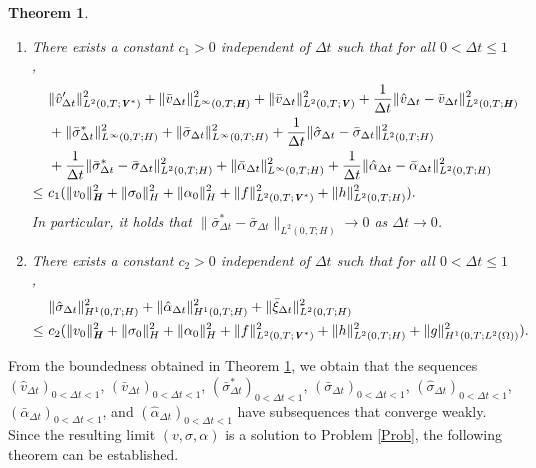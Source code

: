 \documentclass[11pt, a4paper]{article}
\newtheorem{Th}{Theorem}[section]
\newcommand{\dt}{{\Delta t}}
\newcommand{\Lo}{{L^2(\Omega)}}
\newcommand{\bm}[1]{\textbf{\textit{#1}}}%
\newcommand{\Hv}{{\bm{H}}}
\newcommand{\Vv}{{\bm{V}}}
\newcommand{\Hs}{{H}}
\begin{document}
\begin{Th}\label{Th:stab}~
    \begin{enumerate}
        \item[(i)] There exists a constant $c_1 > 0$ independent of $\dt$ such that for all $0<\dt\le1$,
        \[\begin{aligned}
            &\|\hat{v}'_\dt\|_{L^2(0,T;\Vv^*)}^2
            +\|\bar{v}_\dt\|_{L^\infty(0,T;\Hv)}^2 
            + \|\bar{v}_\dt\|_{L^2(0,T;\Vv)}^2
            + \frac{1}{\dt}\|\hat{v}_\dt - \bar{v}_\dt\|_{L^2(0,T;\Hv)}^2\\
            &+ \|\bar{\sigma}^*_\dt\|_{L^\infty(0,T;\Hs)}^2 
            + \|\bar{\sigma}_\dt\|_{L^\infty(0,T;\Hs)}^2
            + \frac{1}{\dt}\|\hat{\sigma}_\dt - \bar{\sigma}_\dt\|_{L^2(0,T;\Hs)}^2\\
            &+ \frac{1}{\dt}\|\bar{\sigma}^*_\dt - \bar{\sigma}_\dt\|_{L^2(0,T;\Hs)}^2
            + \|\bar{\alpha}_\dt\|_{L^\infty(0,T;\Hs)}^2
            + \frac{1}{\dt}\|\hat{\alpha}_\dt - \bar{\alpha}_\dt\|_{L^2(0,T;\Hs)}^2\\
            \le~& c_1(\|v_0\|_\Hv^2 + \|\sigma_0\|_\Hs^2 + \|\alpha_0\|_\Hs^2
            + \|f\|_{L^2(0,T;\Vv^*)}^2 + \|h\|_{L^2(0,T;\Hs)}^2).
        \end{aligned}\]
        In particular, it holds that
        $\|\bar{\sigma}^*_\dt - \bar{\sigma}_\dt\|_{L^2(0,T;\Hs)}\rightarrow0$
        as $\dt\rightarrow0$.
        \item[(ii)] There exists a constant $c_2 > 0$ independent of $\dt$ such that for all $0<\dt\le1$,
        \[\begin{aligned}
            & \|\hat{\sigma}_\dt\|_{H^1(0,T;\Hs)}^2 
            + \|\hat{\alpha}_\dt\|_{H^1(0,T;\Hs)}^2 
            + \|\bar{\xi}_\dt\|_{L^2(0,T;\Hs)}^2\\
            \le~& c_2(\|v_0\|_\Hv^2 + \|\sigma_0\|_\Hs^2 + \|\alpha_0\|_\Hs^2 
            + \|f\|_{L^2(0,T;\Vv^*)}^2 + \|h\|_{L^2(0,T;\Hs)}^2 + \|g\|_{H^1(0,T;\Lo)}^2).
        \end{aligned}\]
    \end{enumerate}
\end{Th}

From the boundedness obtained in Theorem \ref{Th:stab}, we obtain that the sequences $(\hat{v}_\dt)_{0<\dt<1}$, $(\bar{v}_\dt)_{0<\dt<1}$, $(\bar{\sigma}^*_\dt)_{0<\dt<1}$, $(\bar{\sigma}_\dt)_{0<\dt<1}$, $(\hat{\sigma}_\dt)_{0<\dt<1}$, $(\bar{\alpha}_\dt)_{0<\dt<1}$, and $(\hat{\alpha}_\dt)_{0<\dt<1}$ have subsequences that converge weakly. Since the resulting limit $(v,\sigma,\alpha)$ is a solution to Problem \ref{Prob}, the following theorem can be established.
\end{document}
